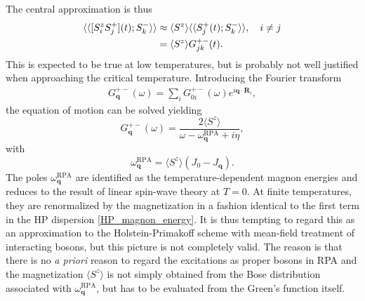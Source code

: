 \documentclass[aps,prb,reprint,floatfix,superscriptaddress]{revtex4-2}
\begin{document}
The central approximation is thus
\begin{align} \label{rpa-approx}
    \langle \langle [S_i^z S_j^+](t); S^-_k\rangle \rangle &\approx \langle S^z \rangle \langle \langle S_j^+(t); S^-_k \rangle \rangle, \quad i\neq j\notag\\  
    &=\langle S^z \rangle G_{jk}^{+-}(t).
\end{align}
This is expected to be true at low temperatures, but is probably not well justified when approaching the critical temperature. Introducing the Fourier transform
\begin{align}
    G_{\mathbf{q}}^{+-}(\omega)= \sum_{i} G_{0i}^{+-}(\omega) e^{i{\mathbf{q}} \cdot \mathbf{R}_i} \label{Gfn-q-space},
\end{align}
the equation of motion can be solved yielding
\begin{equation}\label{G_rpa}
    G_{\mathbf{q}}^{+-}(\omega)=\frac{2\langle S^z\rangle}{\omega-\omega^\mathrm{RPA}_\mathbf{q}+i\eta},
\end{equation}
with
\begin{equation}\label{rpa-magnons3d}
    \omega^\mathrm{RPA}_{\mathbf{q}} = \langle S^z\rangle (J_0  - J_{\mathbf{q}} ).
\end{equation}
The poles $\omega^\mathrm{RPA}_{\mathbf{q}}$ are identified as the temperature-dependent magnon energies and reduces to the result of linear spin-wave theory at $T=0$. At finite temperatures, they are renormalized by the magnetization in a fashion identical to the first term in the HP dispersion \eqref{HP_magnon_energy}. It is thus tempting to regard this as an approximation to the Holstein-Primakoff scheme with mean-field treatment of interacting bosons, but this picture is not completely valid. The reason is that there is no {\it a priori} reason to regard the excitations as proper bosons in RPA and the magnetization $\langle S^z\rangle$ is not simply obtained from the Bose distribution associated with $\omega^\mathrm{RPA}_{\mathbf{q}}$, but has to be evaluated from the Green's function itself.
\end{document}
